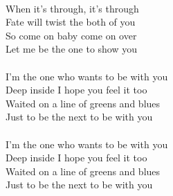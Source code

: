 \begin{multicols}{2}
\columnbreak
\\
When it's through, it's through\\
Fate will twist the both of you\\
So come on baby come on over\\
Let me be the one to show you\\
\\
I'm the one who wants to be with you\\
Deep inside I hope you feel it too\\
Waited on a line of greens and blues\\
Just to be the next to be with you\\
\\
I'm the one who wants to be with you\\
Deep inside I hope you feel it too\\
Waited on a line of greens and blues\\
Just to be the next to be with you\\
\end{multicols}